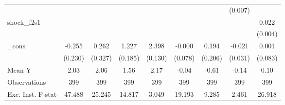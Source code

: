 {\begin{tabular}{l*{8}{c}}
            &                     &                     &                     &                     &                     &                     &     (0.007)         &                     \\
\addlinespace
shock\_f2s1  &                     &                     &                     &                     &                     &                     &                     &       0.022\sym{***}\\
            &                     &                     &                     &                     &                     &                     &                     &     (0.004)         \\
\addlinespace
\_cons      &      -0.255         &       0.262         &       1.227\sym{***}&       2.398\sym{***}&      -0.000         &       0.194         &      -0.021         &       0.001         \\
            &     (0.230)         &     (0.327)         &     (0.185)         &     (0.130)         &     (0.078)         &     (0.206)         &     (0.031)         &     (0.083)         \\
\midrule
Mean Y      &        2.03         &        2.06         &        1.56         &        2.17         &       -0.04         &       -0.61         &       -0.14         &        0.10         \\
Observations&         399         &         399         &         399         &         399         &         399         &         399         &         399         &         399         \\
Exc. Inst. F-stat&      47.488         &      25.245         &      14.817         &       3.049         &      19.193         &       9.285         &       2.461         &      26.918         \\
\bottomrule
\end{tabular}
}
